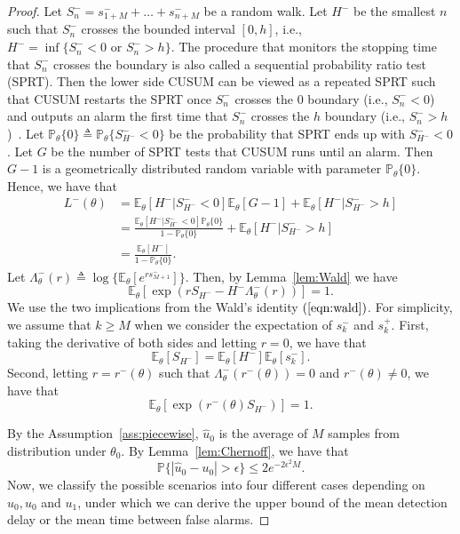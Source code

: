 \documentclass[letterpaper]{article} %
\begin{document}
\begin{proof}
Let $S^-_n=s^-_{1+M}+\ldots+s^-_{n+M}$ be a random walk. Let $H^-$ be the smallest $n$ such that $S^-_n$ crosses the bounded interval $[0,h]$, i.e., $H^-=\inf\{S^-_n<0 \text{ or } S^-_n>h\}$. The procedure that monitors the stopping time that $S^-_n$ crosses the boundary is also called a sequential probability ratio test (SPRT). Then the lower side CUSUM can be viewed as a repeated SPRT such that CUSUM restarts the SPRT once $S^-_n$ crosses the $0$ boundary (i.e., $S^-_n<0$) and outputs an alarm the first time that $S^-_n$ crosses the $h$ boundary (i.e., $S^-_n>h$)~\cite{page1954continuous}. Let $\mathbb{P}_\theta\{0\}\triangleq\mathbb{P}_\theta\{S^-_{H^-}<0\}$ be the probability that SPRT ends up with $S^-_{H^-}<0$. Let $G$ be the number of SPRT tests that CUSUM runs until an alarm. Then $G-1$ is a geometrically distributed random variable with parameter $\mathbb{P}_\theta\{0\}$. Hence, we have that
\begin{align}\nonumber
L^-(\theta)&=\mathbb{E}_\theta[H^-|S^-_{H^-}\!<\! 0]\mathbb{E}_\theta[G \!-\! 1] + \mathbb{E}_\theta[H^-|S^-_{H^-}\!>\! h]\\
\label{arllong}
&=\frac{\mathbb{E}_\theta[H^-|S^-_{H^-}<0]\mathbb{P}_\theta\{0\}}{1-\mathbb{P}_\theta\{0\}} + \mathbb{E}_\theta[H^-|S^-_{H^-}>h]\\
\label{arlshort}
&=\frac{\mathbb{E}_\theta[H^-]}{1-\mathbb{P}_\theta\{0\}}.
\end{align}
Let $\Lambda^-_\theta(r)\triangleq \log\{\mathbb{E}_\theta[e^{rs^-_{M+1}}]\}$. Then, by Lemma~\ref{lem:Wald} we have 
\begin{equation}\label{eqn:wald}
\mathbb{E}_\theta\left[\exp\left(rS_{H^-}-H^-\Lambda^-_\theta(r)\right)\right]=1.
\end{equation}
We use the two implications from the Wald's identity
$(\ref{eqn:wald})$. For simplicity, we assume that $k\geq M$ when we consider the expectation of $s^-_k$ and $s^+_k$. First, taking the derivative of both sides and letting $r=0$, we have that
\begin{equation}\label{eqn:waldeqn}
\mathbb{E}_\theta[S_{H^-}]=\mathbb{E}_\theta[H^-]\mathbb{E}_\theta[s^-_k].
\end{equation}
Second, letting $r=r^-(\theta)$ such that $\Lambda^-_\theta(r^-(\theta))=0$ and $r^-(\theta)\neq0$, we have that
\begin{equation}\label{eqn:waldeqn2}
\mathbb{E}_\theta[\exp{(r^-(\theta)S_{H^-})}]=1.
\end{equation}

By the Assumption~\ref{ass:piecewise}, $\hat{u}_0$ is the average of $M$ samples from distribution under $\theta_0$. By Lemma~\ref{lem:Chernoff}, we have that
\begin{equation}
\mathbb{P}\{|\hat{u}_0-u_0|>\epsilon\}\leq2e^{-2\epsilon^2M}.
\end{equation}
Now, we classify the possible scenarios into four different cases depending on $\hat{u}_0, u_0$ and $u_1$, under which we can derive the upper bound of the mean detection delay or the mean time between false alarms.


\end{proof}
\end{document}
